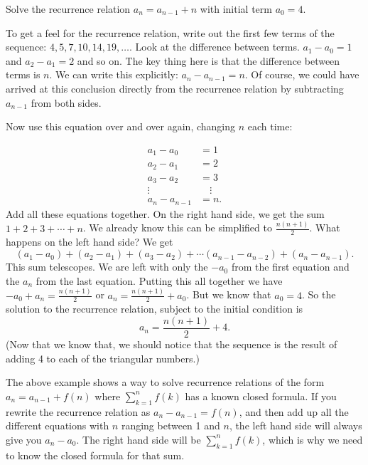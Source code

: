 \documentclass[12pt]{article}
\begin{document}
\begin{example}
  Solve the recurrence relation $a_n = a_{n-1} + n$ with initial term $a_0 = 4$.

  \begin{solution}
    To get a feel for the recurrence relation, write out the first few terms of the sequence: $4, 5, 7, 10, 14, 19, \ldots$.  Look at the difference between terms.  $a_1 - a_0 = 1$ and $a_2 - a_1 = 2$ and so on.  The key thing here is that the difference between terms is $n$.  We can write this explicitly: $a_n - a_{n-1} = n$.  Of course, we could have arrived at this conclusion directly from the recurrence relation by subtracting $a_{n-1}$ from both sides.

    Now use this equation over and over again, changing $n$ each time:

    \begin{align*}
      a_1 - a_0 &= 1\\
      a_2 - a_1 &= 2\\
      a_3 - a_2 & = 3\\
      \vdots \quad & \quad \vdots \\
      a_n - a_{n-1} & = n.
    \end{align*}
  Add all these equations together.  On the right hand side, we get the sum $1 + 2 + 3 + \cdots + n$.  We already know this can be simplified to $\frac{n(n+1)}{2}$.  What happens on the left hand side?  We get
  \[(a_1 - a_0) + (a_2 - a_1) + (a_3 - a_2) + \cdots (a_{n-1} - a_{n-2})+ (a_n - a_{n-1}).\]
  This sum telescopes.  We are left with only the $-a_0$ from the first equation and the $a_n$ from the last equation.  Putting this all together we have $-a_0 + a_n = \frac{n(n+1)}{2}$ or $a_n = \frac{n(n+1)}{2} + a_0$.  But we know that $a_0 = 4$.  So the solution to the recurrence relation, subject to the initial condition is
  \[a_n = \frac{n(n+1)}{2} + 4.\]
  (Now that we know that, we should notice that the sequence is the result of adding 4 to each of the triangular numbers.)
  \end{solution}

\end{example}

The above example shows a way to solve recurrence relations of the form $a_n = a_{n-1} + f(n)$ where $\sum_{k = 1}^n f(k)$ has a known closed formula.  If you rewrite the recurrence relation as $a_n - a_{n-1} = f(n)$, and then add up all the different equations with $n$ ranging between 1 and $n$, the left hand side will always give you $a_n - a_0$.  The right hand side will be $\sum_{k = 1}^n f(k)$, which is why we need to know the closed formula for that sum.
\end{document}
